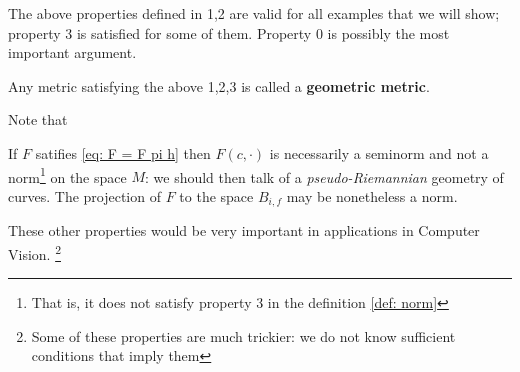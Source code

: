 \documentclass[twoside,a4paper,english]{article}
\begin{document}
The above properties defined in 1,2 are valid for all examples that we will
show; property 3 is satisfied for some of them.
Property 0 is possibly the most important argument.

\begin{Definition}\label{def: geo ene}
  Any metric satisfying the above 1,2,3 is called a {\bf geometric
    metric}. 
\end{Definition}

Note that
\begin{Remark}\label{rem:seminorm}
  If $F$ satifies \eqref{eq: F = F pi h} then $F(c,\cdot)$ is
  necessarily a seminorm and not a norm\footnote{That is, it does not satisfy
    property 3 in the definition \ref{def: norm}} on the space $M$:
  we should then talk of a \emph{pseudo-Riemannian} geometry of curves.
  The projection of $F$ to the space $B_{i,f}$ may be nonetheless
  a norm.
\end{Remark}

\medskip

These other properties would be very important in applications in
Computer Vision.
\footnote{Some of these properties are much trickier: 
  we do not know sufficient conditions that imply them}
\end{document}
